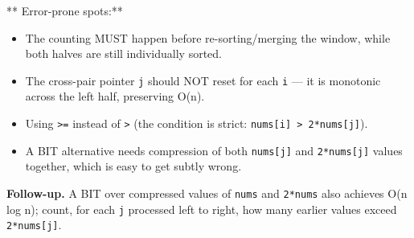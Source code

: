 \documentclass[11pt]{article}
\providecommand{\tightlist}{\setlength{\itemsep}{1pt}\setlength{\parskip}{0pt}}
\begin{document}
** Error-prone spots:**

\begin{itemize}
\tightlist
\item
  The counting MUST happen before re-sorting/merging the window, while both halves are still individually sorted.
\item
  The cross-pair pointer \texttt{j} should NOT reset for each \texttt{i} --- it is monotonic across the left half, preserving O(n).
\item
  Using \texttt{\textgreater{}=} instead of \texttt{\textgreater{}} (the condition is strict: \texttt{nums{[}i{]}\ \textgreater{}\ 2*nums{[}j{]}}).
\item
  A BIT alternative needs compression of both \texttt{nums{[}j{]}} and \texttt{2*nums{[}j{]}} values together, which is easy to get subtly wrong.
\end{itemize}

\textbf{Follow-up.} A BIT over compressed values of \texttt{nums} and \texttt{2*nums} also achieves O(n log n); count, for each \texttt{j} processed left to right, how many earlier values exceed \texttt{2*nums{[}j{]}}.
\end{document}
